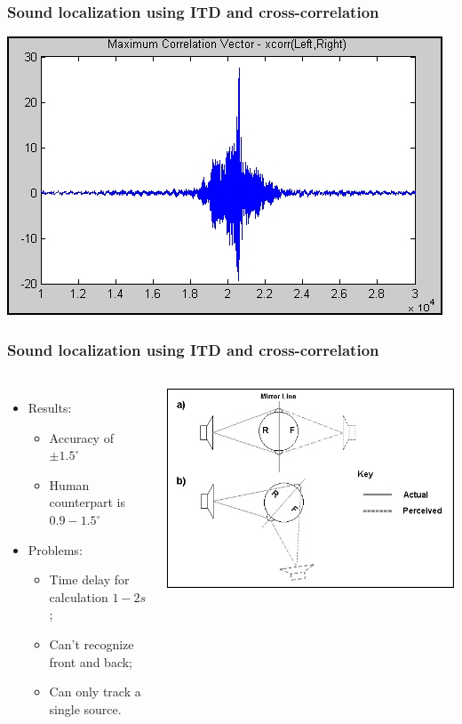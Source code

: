 \documentclass{beamer}
\begin{document}
\begin{frame}
\frametitle{Sound localization using ITD and cross-correlation\cite{murray_robotics_2004}}
\begin{center}
  \includegraphics[width=.7\textwidth]{correl-006}
\end{center}
\end{frame}

\begin{frame}
\frametitle{Sound localization using ITD and cross-correlation\cite{murray_robotics_2004}}
\begin{columns}
\begin{itemize}
  \item Results:
  \begin{itemize}
    \item Accuracy of $\pm 1.5^\circ$
    \item Human counterpart is $0.9 - 1.5^\circ$
  \end{itemize}
  \item Problems: 
  \begin{itemize}
    \item Time delay for calculation $1-2s$;
    \item Can't recognize front and back;
    \item Can only track a single source.
  \end{itemize}
\end{itemize}
\begin{center}
  \includegraphics[width=\textwidth]{correl-008}
\end{center}
  
\end{columns}
\end{frame}
\end{document}
